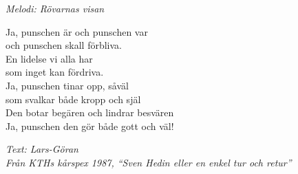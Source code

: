 {\footnotesize\textit{Melodi: Rövarnas visan}}\par
\vspace{10pt}
Ja, punschen är och punschen var\\
och punschen skall förbliva.\\
En lidelse vi alla har\\
som inget kan fördriva.\\
Ja, punschen tinar opp, såväl\\
som svalkar både kropp och själ\\
Den botar begären och lindrar besvären\\
Ja, punschen den gör både gott och väl!\par
\vspace{10pt}
{\footnotesize\textit{Text: Lars-Göran\\
Från KTHs kårspex 1987, ``Sven Hedin eller en enkel tur och retur''}}
